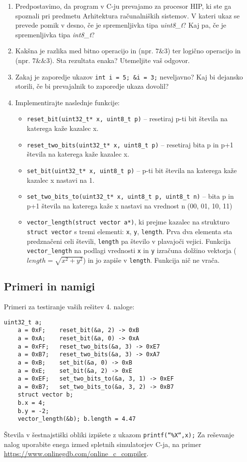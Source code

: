 \documentclass[12pt,letterpaper]{article}
\begin{document}
\begin{enumerate}
    \item Predpostavimo, da program v C-ju prevajamo za procesor HIP, ki ste ga spoznali pri predmetu Arhitektura računalniških sistemov. V kateri ukaz se prevede pomik v desno, če je spremenljivka tipa \textit{uint8\_t}? Kaj pa, če je spremenljivka tipa \textit{int8\_t}?
    \item Kakšna je razlika med bitno operacijo in (npr. $7 \& 3$) ter logično operacijo in (npr. $7 \&\& 3$). Sta rezultata enaka? Utemeljite vaš odgovor.
    \item Zakaj je zaporedje ukazov \texttt{int i = 5; \&i = 3;} neveljavno? Kaj bi dejansko storili, če bi prevajalnik to zaporedje ukaza dovolil?
    \item Implementirajte naslednje funkcije:
\begin{itemize}
    \item \texttt{reset\_bit(uint32\_t* x, uint8\_t p)} – resetiraj p-ti bit števila na katerega kaže kazalec x.
    \item \texttt{reset\_two\_bits(uint32\_t* x, uint8\_t p)} – resetiraj bita p in p+1 števila na katerega kaže kazalec x.
    \item \texttt{set\_bit(uint32\_t* x, uint8\_t p)} – p-ti bit števila na katerega kaže kazalec x nastavi na 1. 
    \item \texttt{set\_two\_bits\_to(uint32\_t* x, uint8\_t p, uint8\_t n)} – bita p in p+1 števila na katerega kaže x nastavi na vrednost n (00, 01, 10, 11)
    \item \texttt{vector\_length(struct vector a*)}, ki prejme kazalec na strukturo \texttt{struct vector} s tremi elementi: \texttt{x}, \texttt{y}, \texttt{length}. Prva dva elementa sta predznačeni celi števili, \texttt{length} pa število v plavajoči vejici. Funkcija \texttt{vector\_length} na podlagi vrednosti \texttt{x} in \texttt{y} izračuna dolžino vektorja ($length = \sqrt{x^2+y^2}$) in jo zapiše v \texttt{length}. Funkcija nič ne vrača.
\end{itemize}
\end{enumerate}
\newpage


\subsection*{Primeri in namigi}

Primeri za testiranje vaših rešitev 4. naloge: 
\begin{center}
\begin{lstlisting}[style=CStyle]
    uint32_t a;
    a = 0xF;    reset_bit(&a, 2) -> 0xB
    a = 0xA;    reset_bit(&a, 0) -> 0xA
    a = 0xFF;   reset_two_bits(&a, 3) -> 0xE7
    a = 0xB7;   reset_two_bits(&a, 3) -> 0xA7
    a = 0xB;    set_bit(&a, 0) -> 0xB
    a = 0xE;    set_bit(&a, 2) -> 0xE
    a = 0xEF;   set_two_bits_to(&a, 3, 1) -> 0xEF
    a = 0xB7;   set_two_bits_to(&a, 3, 2) -> 0xB7
    struct vector b;
    b.x = 4;
    b.y = -2;
    vector_length(&b); b.length = 4.47
\end{lstlisting}
\end{center}

Števila v šestnajstiški obliki izpišete z ukazom \texttt{printf(``\%X``,x);} Za reševanje nalog uporabite enega izmed spletnih simulatorjev C-ja, na primer \href{https://www.onlinegdb.com/online_c_compiler}{https://www.onlinegdb.com/online\_c\_compiler}.
\end{document}
